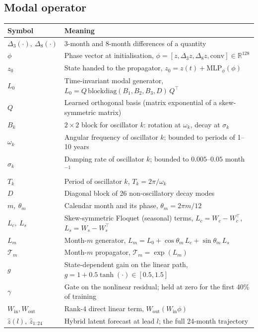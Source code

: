 \subsection*{Modal operator}
\begin{center}
\begin{tabular}{@{}ll@{}}
\toprule
Symbol & Meaning \\
\midrule
$\Delta_3(\cdot),\ \Delta_8(\cdot)$ & 3-month and 8-month differences of a quantity \\
$\phi$ & Phase vector at initialisation,
          $\phi=[z,\Delta_3z,\Delta_8z,\mathrm{conv}]\in\mathbb{R}^{128}$ \\
$z_0$ & State handed to the propagator, $z_0 = z(t) + \mathrm{MLP}_{\phi}(\phi)$ \\
$L_0$ & Time-invariant modal generator,
        $L_0 = Q\,\mathrm{blockdiag}(B_1,B_2,B_3,D)\,Q^{\top}$ \\
$Q$ & Learned orthogonal basis (matrix exponential of a skew-symmetric matrix) \\
$B_k$ & $2\times2$ block for oscillator $k$: rotation at $\omega_k$, decay at $\sigma_k$ \\
$\omega_k$ & Angular frequency of oscillator $k$; bounded to periods of 1--10 years \\
$\sigma_k$ & Damping rate of oscillator $k$; bounded to $0.005$--$0.05$ month$^{-1}$ \\
$T_k$ & Period of oscillator $k$, $T_k = 2\pi/\omega_k$ \\
$D$ & Diagonal block of 26 non-oscillatory decay modes \\
$m,\ \theta_m$ & Calendar month and its phase, $\theta_m = 2\pi m/12$ \\
$L_c,\ L_s$ & Skew-symmetric Floquet (seasonal) terms, $L_c=W_c-W_c^{\top}$,
              $L_s=W_s-W_s^{\top}$ \\
$L_m$ & Month-$m$ generator, $L_m = L_0 + \cos\theta_m\,L_c + \sin\theta_m\,L_s$ \\
$\mathcal{T}_m$ & Month-$m$ propagator, $\mathcal{T}_m = \exp(L_m)$ \\
$g$ & State-dependent gain on the linear path, $g=1+0.5\tanh(\cdot)\in[0.5,1.5]$ \\
$\gamma$ & Gate on the nonlinear residual; held at zero for the first 40\% of training \\
$W_{\mathrm{in}}, W_{\mathrm{out}}$ & Rank-4 direct linear term,
                                      $W_{\mathrm{out}}(W_{\mathrm{in}}\phi)$ \\
$\hat z(l),\ \hat z_{1:24}$ & Hybrid latent forecast at lead $l$; the full 24-month
                              trajectory \\
\bottomrule
\end{tabular}
\end{center}

